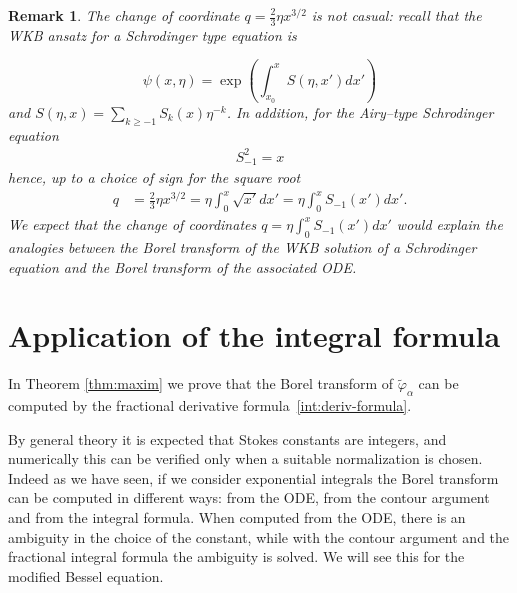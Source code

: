 \documentclass{article}
\newtheorem{remark}[definition]{Remark}
\begin{document}
\begin{remark}
The change of coordinate $q=\frac{2}{3}\eta x^{3/2}$ is not casual: recall that the WKB ansatz for a Schrodinger type equation is

\begin{equation}
\psi(x,\eta)=\exp\left(\int_{x_0}^xS(\eta,x')dx'\right)
\end{equation} 
 and $S(\eta,x)=\sum_{k\geq -1}S_k(x)\eta^{-k}$. In addition, for the Airy--type Schrodinger equation 
 \begin{align*}
 S_{-1}^2=x
 \end{align*}
hence, up to a choice of sign for the square root
\begin{align*}
q&=\frac{2}{3}\eta x^{3/2}=\eta\int_0^x\sqrt{x'}dx'=\eta\int_{0}^xS_{-1}(x')dx'.
\end{align*}
We expect that the change of coordinates $q=\eta\int_0^{x}S_{-1}(x')dx'$ would explain the analogies between the Borel transform of the WKB solution of a Schrodinger equation and the Borel transform of the associated ODE.  
\end{remark} 

\section{Application of the integral formula}

In Theorem \eqref{thm:maxim} we prove that the Borel transform of $\tilde{\varphi}_{\alpha}$ can be computed by the fractional derivative formula~\eqref{int:deriv-formula}. \color{olive} 


By general theory it is expected that Stokes constants are integers, and numerically this can be verified only when a suitable normalization is chosen. Indeed as we have seen, if we consider exponential integrals the Borel transform can be computed in different ways: from the ODE, from the contour argument and from the integral formula. When computed from the ODE, there is an ambiguity in the choice of the constant, while with the contour argument and the fractional integral formula the ambiguity is solved. We will see this for the modified Bessel equation. 
\end{document}
